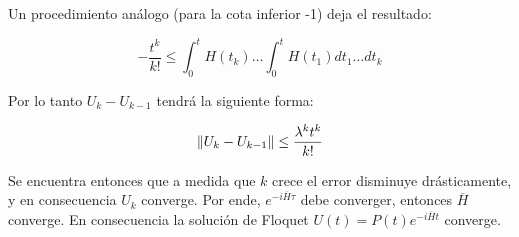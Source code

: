 Un procedimiento análogo (para la cota inferior -1)  deja el resultado:

\begin{equation}\label{eq:D.13}
    -\frac{t^k}{k!} \leq \int^{t}_0H(t_k)\dots \int^{t}_0H(t_1)dt_1 \dots dt_k
\end{equation}

Por lo tanto $U_k-U_{k-1}$ tendrá la siguiente forma:

\begin{equation}\label{eq:D.14}
    \norm{U_k-U_{k-1}}\leq \frac{\lambda^kt^k}{k!}
\end{equation}

Se encuentra entonces que a medida que $k$ crece el error disminuye drásticamente, y en consecuencia $U_k$ converge. Por ende, $e^{-i\overline{H}\tau}$ debe converger, entonces $\overline{H}$ converge. En consecuencia la solución de Floquet  $U(t)=P(t)e^{-i\overline{H}t}$ converge. 
